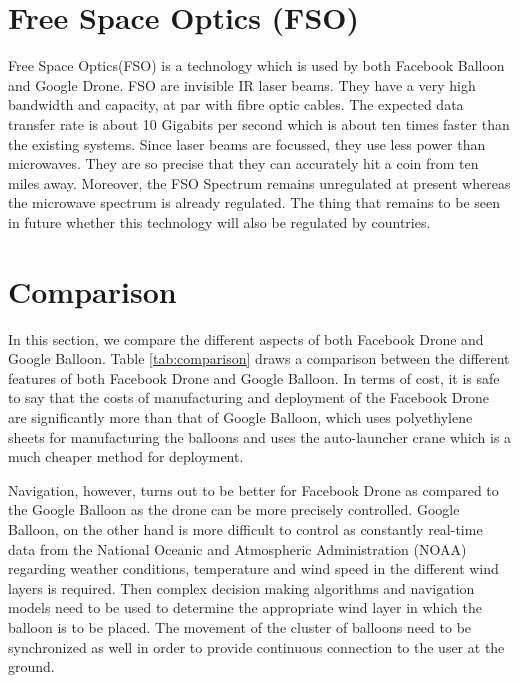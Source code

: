 \documentclass{llncs}
\begin{document}
	\section{Free Space Optics (FSO)}
	Free Space Optics(FSO)\cite{facebookdrone} is a technology which is used by both Facebook Balloon and Google Drone. FSO are 
	invisible 
	IR laser beams. They have a very high bandwidth and capacity, at par with fibre optic cables. The expected 
	data 
	transfer rate is about 10 Gigabits per second which is about ten times faster than the existing systems. 
	Since 
	laser beams 	are focussed, they use less power than microwaves. They are so precise that they can 
	accurately hit a 
	coin from ten miles away. Moreover, the FSO Spectrum remains unregulated at present whereas the microwave 
	spectrum 
	is already regulated. The thing that remains to be seen in future whether this technology will also be regulated 
	by 
	countries.    
	
    \section{Comparison}
    	In this section, we compare the different aspects of both Facebook Drone and Google Balloon. Table \ref{tab:comparison}
    	draws a comparison between the different features of both Facebook Drone and Google Balloon. 	In terms of 
    	cost, it is safe to say that the costs of manufacturing and deployment of the Facebook Drone are 
    	significantly more than that of Google Balloon, which uses polyethylene sheets for manufacturing the balloons
    	and uses the auto-launcher crane which is a much cheaper method for deployment. 
    	
    	Navigation, however, turns out to be better for Facebook Drone as compared to the Google Balloon as the 
    	drone can be more precisely controlled. Google Balloon, on the other hand is more difficult to control as 
    	constantly real-time data from the National Oceanic and Atmospheric Administration (NOAA) regarding weather 
    	conditions, temperature and wind speed in the different wind layers is required. Then complex decision making 
    	algorithms and navigation models need to be used to determine the appropriate wind layer in which the 
    	balloon is to be placed. The movement of the cluster of balloons need to be synchronized as well in order 
    	to provide continuous connection to the user at the ground. 
    	
\end{document}
